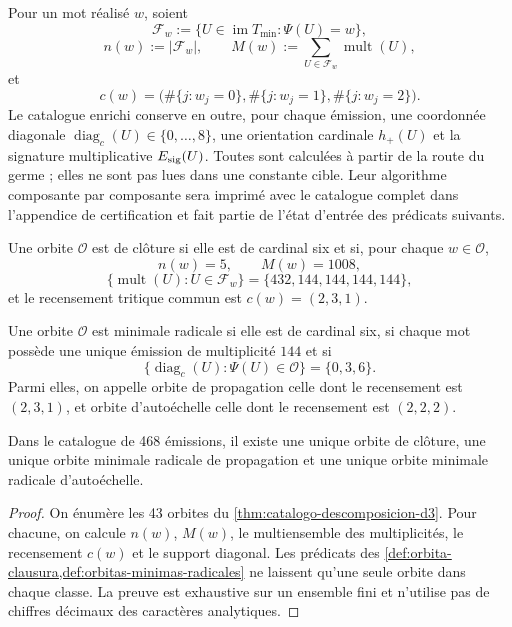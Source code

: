 Pour un mot réalisé \(w\), soient
\[
 \mathcal F_w:=\{U\in\operatorname{im}T_{\min}:\Psi(U)=w\},
\]
\[
 n(w):=|\mathcal F_w|,
 \qquad
 M(w):=\sum_{U\in\mathcal F_w}\operatorname{mult}(U),
\]
et
\[
 c(w)=\bigl(\#\{j:w_j=0\},\#\{j:w_j=1\},\#\{j:w_j=2\}\bigr).
\]
Le catalogue enrichi conserve en outre, pour chaque émission, une coordonnée
diagonale \(\operatorname{diag}_c(U)\in\{0,\ldots,8\}\), une orientation
cardinale \(h_+(U)\) et la signature multiplicative \(E_{\rm sig}(U)\). Toutes
sont calculées à partir de la route du germe ; elles ne sont pas lues dans une constante
cible. Leur algorithme composante par composante sera imprimé avec le catalogue
complet dans l'appendice de certification et fait partie de l'état d'entrée
des prédicats suivants.

\begin{definition}
\label{def:orbita-clausura}
Une orbite \(\mathcal O\) est de clôture si elle est de cardinal six et si, pour
chaque \(w\in\mathcal O\),
\[
 n(w)=5,
 \qquad
 M(w)=1008,
\]
\[
 \{\operatorname{mult}(U):U\in\mathcal F_w\}
 =\{432,144,144,144,144\},
\]
et le recensement tritique commun est \(c(w)=(2,3,1)\).
\end{definition}

\begin{definition}
\label{def:orbitas-minimas-radicales}
Une orbite \(\mathcal O\) est minimale radicale si elle est de cardinal six, si chaque
mot possède une unique émission de multiplicité \(144\) et si
\[
 \{\operatorname{diag}_c(U):\Psi(U)\in\mathcal O\}=\{0,3,6\}.
\]
Parmi elles, on appelle orbite de propagation celle dont le recensement est
\((2,3,1)\), et orbite d'autoéchelle celle dont le recensement est \((2,2,2)\).
\end{definition}

\begin{theorem}
\label{thm:unicidad-tres-orbitas-estructurales}
Dans le catalogue de 468 émissions, il existe une unique orbite de clôture, une
unique orbite minimale radicale de propagation et une unique orbite minimale radicale
d'autoéchelle.
\end{theorem}

\begin{proof}
On énumère les 43 orbites du \cref{thm:catalogo-descomposicion-d3}. Pour
chacune, on calcule \(n(w)\), \(M(w)\), le multiensemble des
multiplicités, le recensement \(c(w)\) et le support diagonal. Les prédicats des
\cref{def:orbita-clausura,def:orbitas-minimas-radicales} ne laissent qu'une seule
orbite dans chaque classe. La preuve est exhaustive sur un ensemble fini et
n'utilise pas de chiffres décimaux des caractères analytiques.
\end{proof}

